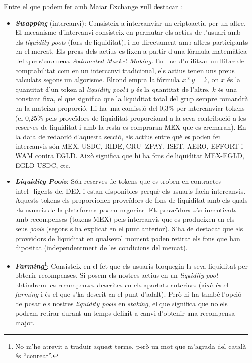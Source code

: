 \documentclass[11pt,a4paper]{article}
\begin{document}
Entre el que podem fer amb Maiar Exchange vull destacar \cite{everstake2021}\cite{elrond2021}:
\begin{itemize}
\item \textbf{\textit{Swapping}} (intercanvi): Consisteix a intercanviar un criptoactiu per un altre. El mecanisme d'intercanvi consisteix en permutar els actius de l'usuari amb els \textit{liquidity pools} (fons de liquiditat), i no directament amb altres participants en el mercat. Els preus dels actius es fixen a partir d'una fórmula matemàtica del que s'anomena \textit{Automated Market Making}. En lloc d'utilitzar un llibre de comptabilitat com en un intercanvi tradicional, els actius tenen uns preus calculats segons un algorisme. Elrond empra la fórmula \(x * y = k\), on \(x\) és la quantitat d'un token al \textit{liquidity pool} i \(y\) és la quantitat de l'altre. \(k\) és una constant fixa, el que significa que la liquiditat total del grup sempre romandrà en la mateixa proporció. Hi ha una comissió del 0,3\% per intercanviar tokens (el 0,25\% pels proveïdors de liquiditat proporcional a la seva contribució a les reserves de liquiditat i amb la resta es compraran MEX que es cremaran). En la data de redacció d'aquesta secció, els actius entre què es poden fer intercanvis són MEX, USDC, RIDE, CRU, ZPAY, ISET, AERO, EFFORT i WAM contra  EGLD. Això significa que hi ha fons de liquiditat MEX-EGLD, EGLD-USDC, etc.
\item \textit{\textbf{Liquidity Pools}}:  Són reserves de tokens que es troben en contractes intel·ligents del DEX i estan disponibles perquè els usuaris facin intercanvis. Aquests tokens els proporcionen proveïdors de fons de liquiditat amb els quals els usuaris de la plataforma poden negociar. Els proveïdors són incentivats amb recompenses (tokens MEX) pels intercanvis que es produeixen en els seus \textit{pools} (segons s'ha explicat en el punt anterior). S'ha de destacar que els proveïdors de liquiditat en qualsevol moment poden retirar els fons que han dipositat (independentment de les condicions del mercat).  
\item \textit{\textbf{Farming}}\footnote{No m'he atrevit a traduir aquest terme, però un mot que m'agrada del català és ``conrear''.}: Consisteix en el fet que els usuaris bloquegin la seva liquiditat per obtenir recompenses. Si posem els nostres actius en un \textit{liquidity pool} obtindrem les recompenses descrites en els apartats anteriors (això és el \textit{farming} i és el que s'ha descrit en el punt d'adalt). Però hi ha també l'opció de posar els nostres \textit{liquidity pools} en \textit{staking}, el que significa que no els podrem retirar durant un temps definit a canvi d'obtenir una recompensa major.
\end{itemize}
\end{document}
